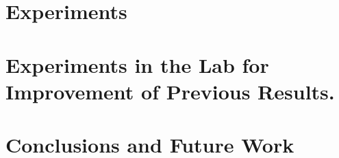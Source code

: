 \documentclass[10pt]{report}
\begin{document}
\chapter{Experiments}


\chapter{Experiments in the Lab for Improvement of Previous Results.}

\chapter{Conclusions and Future Work}

\begin{appendices}









\end{appendices}
	

\end{document}
